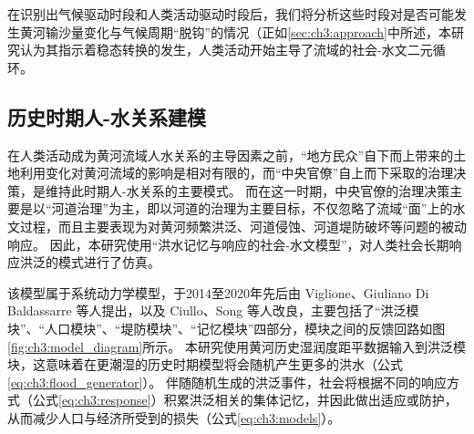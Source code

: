 在识别出气候驱动时段和人类活动驱动时段后，我们将分析这些时段对是否可能发生黄河输沙量变化与气候周期“脱钩”的情况（正如\ref{sec:ch3:approach}中所述，本研究认为其指示着稳态转换的发生，人类活动开始主导了流域的社会-水文二元循环。

\subsection{历史时期人-水关系建模}

在人类活动成为黄河流域人水关系的主导因素之前，“地方民众”自下而上带来的土地利用变化对黄河流域的影响是相对有限的，而“中央官僚”自上而下采取的治理决策，是维持此时期人-水关系的主要模式。
而在这一时期，中央官僚的治理决策主要是以“河道治理”为主，即以河道的治理为主要目标，不仅忽略了流域“面”上的水文过程，而且主要表现为对黄河频繁洪泛、河道侵蚀、河道堤防破坏等问题的被动响应。
因此，本研究使用“洪水记忆与响应的社会-水文模型”，对人类社会长期响应洪泛的模式进行了仿真。

该模型属于系统动力学模型，于2014至2020年先后由 Viglione、Giuliano Di Baldassarre 等人提出，以及 Ciullo、Song 等人改良，主要包括了“洪泛模块”、“人口模块”、“堤防模块”、“记忆模块”四部分，模块之间的反馈回路如图\ref{fig:ch3:model_diagram}所示。 %
本研究使用黄河历史湿润度距平数据输入到洪泛模块，这意味着在更潮湿的历史时期模型将会随机产生更多的洪水（公式\ref{eq:ch3:flood_generator}）。
伴随随机生成的洪泛事件，社会将根据不同的响应方式（公式\ref{eq:ch3:response}）积累洪泛相关的集体记忆，并因此做出适应或防护，从而减少人口与经济所受到的损失（公式\ref{eq:ch3:models}）。

